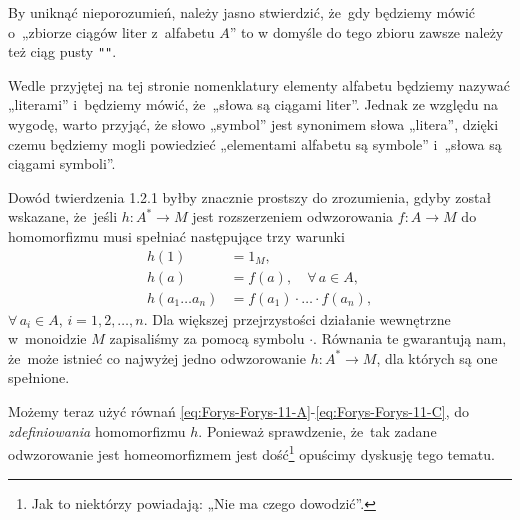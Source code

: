 \documentclass[a4paper,11pt]{article}
\begin{document}
\vspace{\spaceFour}





\start {} By uniknąć nieporozumień, należy jasno stwierdzić, że~gdy
będziemy mówić o~„zbiorze ciągów liter z~alfabetu $A$” to w domyśle do tego
zbioru zawsze należy też ciąg pusty \texttt{""}.

\vspace{\spaceFour}





\start {} Wedle przyjętej na tej stronie nomenklatury elementy
alfabetu będziemy nazywać „literami” i~będziemy mówić, że~„słowa są
ciągami liter”. Jednak ze względu na wygodę, warto przyjąć, że słowo
„symbol” jest synonimem słowa „litera”, dzięki czemu będziemy mogli
powiedzieć „elementami alfabetu są symbole” i~„słowa są ciągami
symboli”.

\vspace{\spaceFour}





\start {} Dowód twierdzenia 1.2.1 byłby znacznie prostszy do
zrozumienia, gdyby został wskazane, że~jeśli $h : A^{ * } \to M$ jest
rozszerzeniem odwzorowania $f : A \to M$ do homomorfizmu musi spełniać
następujące trzy warunki
\begin{subequations}
  \begin{align}
    \label{eq:Forys-Forys-11-A}
    h( 1 ) &= 1_{ M }, \\
    \label{eq:Forys-Forys-11-B}
    h( a ) &= f( a ), \quad \forall \, a \in A, \\
    \label{eq:Forys-Forys-11-C}
    h( a_{ 1 } \ldots a_{ n } )
           &= f( a_{ 1 } ) \cdot \ldots \cdot f( a_{ n } ),
  \end{align}
\end{subequations}
$\forall \, a_{ i } \in A$, $i = 1, 2, \ldots, n$. Dla większej przejrzystości działanie
wewnętrzne w~monoidzie $M$ zapisaliśmy za pomocą symbolu $\cdot$. Równania te
gwarantują nam, że~może istnieć co najwyżej jedno odwzorowanie
$h : A^{ * } \to M$, dla których są one spełnione.

Możemy teraz użyć równań
\eqref{eq:Forys-Forys-11-A}-\eqref{eq:Forys-Forys-11-C}, do
\textit{zdefiniowania} homomorfizmu $h$. Ponieważ sprawdzenie, że~tak zadane
odwzorowanie jest homeomorfizmem jest dość\footnote{Jak to niektórzy
  powiadają: „Nie ma czego dowodzić”.} opuścimy dyskusję tego tematu.
\end{document}

